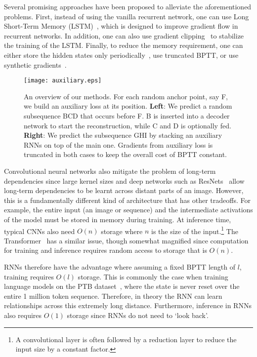 \documentclass{article}
\begin{document}
Several promising approaches have been proposed to alleviate the aforementioned problems. First, instead of using the vanilla recurrent network, one can use Long Short-Term Memory (LSTM)~\cite{hochreiter1997long}, which is designed to improve gradient flow in recurrent networks. In addition, one can also use gradient clipping~\cite{pascanu2013difficulty} to stabilize the training of the LSTM. Finally, to reduce the memory requirement, one can either store the hidden states only periodically~\cite{gruslys2016memory, chen2016training}, use truncated BPTT, or use synthetic gradients~\cite{Jaderberg16synthGrad}. 


\begin{figure*}[tb]
\centering
\texttt{[image: auxiliary.eps]}
\caption{An overview of our methods. For each random anchor point, say F, we build an auxiliary loss at its position. \textbf{Left}: We predict a random subsequence BCD that occurs before F. B is inserted into a decoder network to start the reconstruction, while C and D is optionally fed. \textbf{Right}: We predict the subsequence GHI by stacking an auxiliary RNNs on top of the main one. Gradients from auxiliary loss is truncated in both cases to keep the overall cost of BPTT constant.}
\label{fig:method}
\end{figure*}


Convolutional neural networks also mitigate the problem of long-term dependencies since large kernel sizes and deep networks such as ResNets~\cite{he2016deep} allow long-term dependencies to be learnt across distant parts of an image. However, this is a fundamentally different kind of architecture that has other tradeoffs. For example, the entire input  (an image or sequence) and the intermediate activations of the model must be stored in memory during training. At inference time, typical CNNs also need $O(n)$ storage where $n$ is the size of the input.\footnote{A convolutional layer is often followed by a reduction layer to reduce the input size by a constant factor.} The Transformer~\cite{vaswani2017attention} has a similar issue, though somewhat magnified since computation for training and inference requires random access to storage that is $O(n)$.

RNNs therefore have the advantage where assuming a fixed BPTT length of $l$, training requires $O(l)$ storage. This is commonly the case when training language models on the PTB dataset~\cite{penntreebank}, where the state is never reset over the entire 1 million token sequence. Therefore, in theory the RNN can learn relationships across this extremely long distance. Furthermore, inference in RNNs also requires $O(1)$ storage since RNNs do not need to `look back'.
\end{document}
